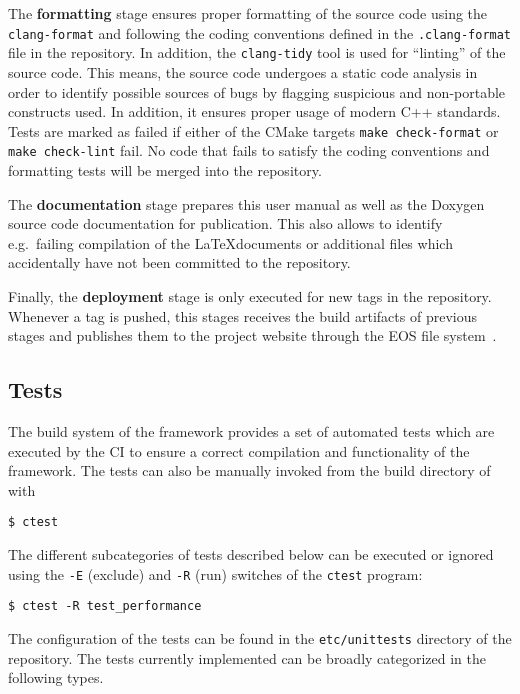 The \textbf{formatting} stage ensures proper formatting of the source code using the \texttt{clang-format} and following the coding conventions defined in the \texttt{.clang-format} file in the repository.
In addition, the \texttt{clang-tidy} tool is used for ``linting'' of the source code.
This means, the source code undergoes a static code analysis in order to identify possible sources of bugs by flagging suspicious and non-portable constructs used.
In addition, it ensures proper usage of modern C++ standards.
Tests are marked as failed if either of the CMake targets \texttt{make check-format} or \texttt{make check-lint} fail.
No code that fails to satisfy the coding conventions and formatting tests will be merged into the repository.

The \textbf{documentation} stage prepares this user manual as well as the Doxygen source code documentation for publication.
This also allows to identify e.g.\ failing compilation of the \LaTeX documents or additional files which accidentally have not been committed to the repository.

Finally, the \textbf{deployment} stage is only executed for new tags in the repository.
Whenever a tag is pushed, this stages receives the build artifacts of previous stages and publishes them to the \apsq project website through the EOS file system~\cite{eos}.

\subsection{Tests}
\label{sec:tests}

The build system of the framework provides a set of automated tests which are executed by the CI to ensure a correct compilation and functionality of the framework.
The tests can also be manually invoked from the build directory of \apsq with
\begin{verbatim}
$ ctest
\end{verbatim}

The different subcategories of tests described below can be executed or ignored using the \texttt{-E} (exclude) and \texttt{-R} (run) switches of the \texttt{ctest} program:
\begin{verbatim}
$ ctest -R test_performance
\end{verbatim}

The configuration of the tests can be found in the \texttt{etc/unittests} directory of the repository.
The tests currently implemented can be broadly categorized in the following types.

